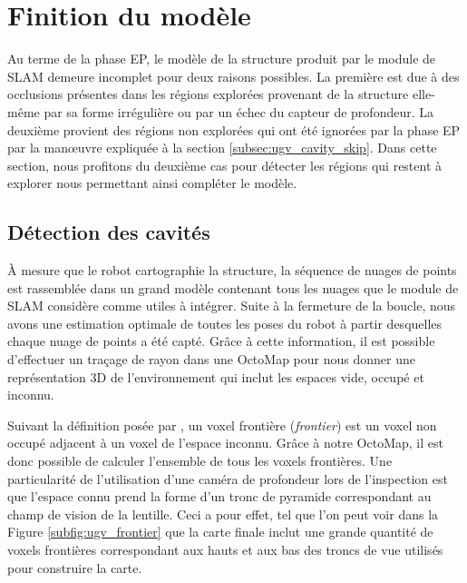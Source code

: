 \section{Finition du modèle} \label{sec:cavity_exploration}

Au terme de la phase EP, le modèle de la structure produit par le module de SLAM demeure incomplet pour deux raisons possibles. La première est due à des occlusions présentes dans les régions explorées provenant de la structure elle-même par sa forme irrégulière ou par un échec du capteur de profondeur. La deuxième provient des régions non explorées qui ont été ignorées par la phase EP par la man\oe uvre expliquée à la section \ref{subsec:ugv_cavity_skip}. Dans cette section, nous profitons du deuxième cas pour détecter les régions qui restent à explorer nous permettant ainsi compléter le modèle.

\subsection{Détection des cavités}

À mesure que le robot cartographie la structure, la séquence de nuages de points est rassemblée dans un grand modèle contenant tous les nuages que le module de SLAM considère comme utiles à intégrer. Suite à la fermeture de la boucle, nous avons une estimation optimale de toutes les poses du robot à partir desquelles chaque nuage de points a été capté. Grâce à cette information, il est possible d'effectuer un traçage de rayon dans une OctoMap \citep{Hornung2013} pour nous donner une représentation 3D de l'environnement qui inclut les espaces vide, occupé et inconnu.

Suivant la définition posée par \cite{Yamauchi1997}, un voxel frontière (\emph{frontier}) est un voxel non occupé adjacent à un voxel de l'espace inconnu. Grâce à notre OctoMap, il est donc possible de calculer l'ensemble de tous les voxels frontières. Une particularité de l'utilisation d'une caméra de profondeur lors de l'inspection est que l'espace connu prend la forme d'un tronc de pyramide correspondant au champ de vision de la lentille. Ceci a pour effet, tel que l'on peut voir dans la Figure \ref{subfig:ugv_frontier} que la carte finale inclut une grande quantité de voxels frontières correspondant aux hauts et aux bas des troncs de vue utilisés pour construire la carte.

